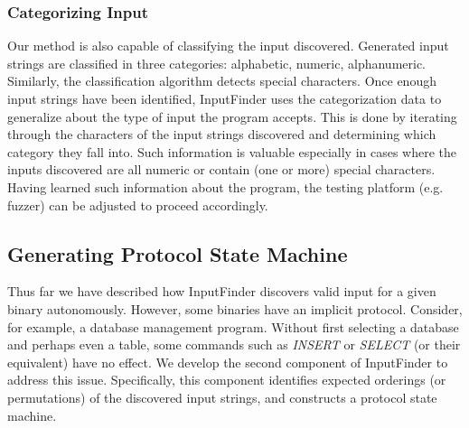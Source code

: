\documentclass{sig-alternate-05-2015}
\def \tool {InputFinder}
\begin{document}
\subsubsection{Categorizing Input}
Our method is also capable of classifying the input discovered.
Generated input strings are classified in three categories: alphabetic, numeric, alphanumeric.
Similarly, the classification algorithm detects special characters.
Once enough input strings have been identified, \tool{} uses the categorization data to generalize about the type of input the program accepts.
This is done by iterating through the characters of the input strings discovered and determining which category they fall into.
Such information is valuable especially in cases where the inputs discovered are all numeric or contain (one or more) special characters.
Having learned such information about the program, the testing platform (e.g. fuzzer) can be adjusted to proceed accordingly.

\subsection{Generating Protocol State Machine}
Thus far we have described how \tool{} discovers valid input for a given binary autonomously.
However, some binaries have an implicit protocol.
Consider, for example, a database management program.
Without first selecting a database and perhaps even a table, some commands such as \textit{INSERT} or \textit{SELECT} (or their equivalent) have no effect.
We develop the second component of \tool{} to address this issue.
Specifically, this component identifies expected orderings (or permutations) of the discovered input strings, and constructs a protocol state machine.
\end{document}
